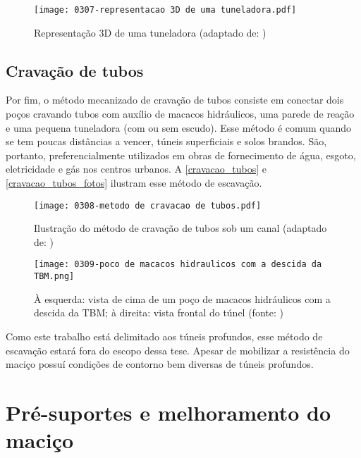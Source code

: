 \begin{figure}[H]
	\begin{center}
		\texttt{[image: 0307-representacao 3D de uma tuneladora.pdf]}
	\end{center}
	\caption{\label{representacao_tuneladora}Representação 3D de uma tuneladora (adaptado de: )}
\end{figure}

\subsection{Cravação de tubos}

Por fim, o método mecanizado de cravação de tubos consiste em conectar dois poços cravando tubos com auxílio de macacos hidráulicos, uma parede de reação e uma pequena tuneladora (com ou sem escudo). Esse método é comum quando se tem poucas distâncias a vencer, túneis superficiais e solos brandos. São, portanto, preferencialmente utilizados em obras de fornecimento de água, esgoto, eletricidade e gás nos centros urbanos. A \autoref{cravacao_tubos} e \autoref{cravacao_tubos_fotos} ilustram esse método de escavação.

\begin{figure}[H]
	\begin{center}
		\texttt{[image: 0308-metodo de cravacao de tubos.pdf]}
	\end{center}
	\caption{\label{cravacao_tubos}Ilustração do método de cravação de tubos sob um canal (adaptado de: )}
\end{figure}

\begin{figure}[H]
	\begin{center}
		\texttt{[image: 0309-poco de macacos hidraulicos com a descida da TBM.png]}
	\end{center}
	\caption{\label{cravacao_tubos_fotos}À esquerda: vista de cima de um poço de macacos hidráulicos com a descida da TBM; à direita: vista frontal do túnel (fonte: )}
\end{figure}

Como este trabalho está delimitado aos túneis profundos, esse método de escavação estará fora do escopo dessa tese. Apesar de mobilizar a resistência do maciço possuí condições de contorno bem diversas de túneis profundos.

\section{Pré-suportes e melhoramento do maciço}

